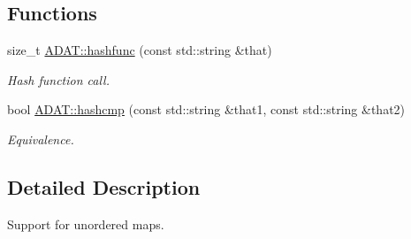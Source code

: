 \subsection*{Functions}
\begin{DoxyCompactItemize}
\item 
size\+\_\+t \mbox{\hyperlink{namespaceADAT_ac0708a73475d6ed645b663e2d919f90b}{A\+D\+A\+T\+::hashfunc}} (const std\+::string \&that)
\begin{DoxyCompactList}\small\item\em Hash function call. \end{DoxyCompactList}\item 
bool \mbox{\hyperlink{namespaceADAT_a3145f853c462f1c95b958f5deb7709a5}{A\+D\+A\+T\+::hashcmp}} (const std\+::string \&that1, const std\+::string \&that2)
\begin{DoxyCompactList}\small\item\em Equivalence. \end{DoxyCompactList}\end{DoxyCompactItemize}


\subsection{Detailed Description}
Support for unordered maps. 

